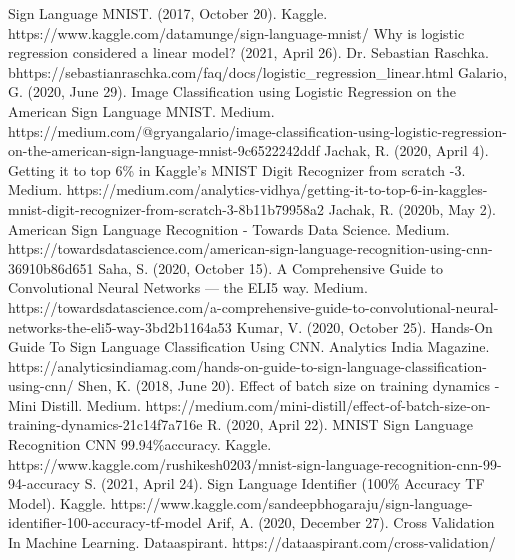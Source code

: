 \documentclass[conference]{IEEEtran}
\begin{document}
\begin{thebibliography}{00}

 Sign Language MNIST. (2017, October 20). Kaggle. https://www.kaggle.com/datamunge/sign-language-mnist/
 Why is logistic regression considered a linear model? (2021, April 26). Dr. Sebastian Raschka.
bhttps://sebastianraschka.com/faq/docs/logistic\_regression\_linear.html
 Galario, G. (2020, June 29). Image Classification using Logistic Regression on the American Sign Language MNIST. Medium. https://medium.com/@gryangalario/image-classification-using-logistic-regression-on-the-american-sign-language-mnist-9c6522242ddf
 Jachak, R. (2020, April 4). Getting it to top 6\% in Kaggle’s MNIST Digit Recognizer from scratch -3. Medium. https://medium.com/analytics-vidhya/getting-it-to-top-6-in-kaggles-mnist-digit-recognizer-from-scratch-3-8b11b79958a2
 Jachak, R. (2020b, May 2). American Sign Language Recognition - Towards Data Science. Medium. https://towardsdatascience.com/american-sign-language-recognition-using-cnn-36910b86d651
 Saha, S. (2020, October 15). A Comprehensive Guide to Convolutional Neural Networks — the ELI5 way. Medium. https://towardsdatascience.com/a-comprehensive-guide-to-convolutional-neural-networks-the-eli5-way-3bd2b1164a53
 Kumar, V. (2020, October 25). Hands-On Guide To Sign Language Classification Using CNN. Analytics India Magazine. https://analyticsindiamag.com/hands-on-guide-to-sign-language-classification-using-cnn/
 Shen, K. (2018, June 20). Effect of batch size on training dynamics - Mini Distill. Medium. https://medium.com/mini-distill/effect-of-batch-size-on-training-dynamics-21c14f7a716e
 R. (2020, April 22). MNIST Sign Language Recognition CNN 99.94\%accuracy. Kaggle. https://www.kaggle.com/rushikesh0203/mnist-sign-language-recognition-cnn-99-94-accuracy
 S. (2021, April 24). Sign Language Identifier (100\% Accuracy TF Model). Kaggle. https://www.kaggle.com/sandeepbhogaraju/sign-language-identifier-100-accuracy-tf-model
 Arif, A. (2020, December 27). Cross Validation In Machine Learning. Dataaspirant. https://dataaspirant.com/cross-validation/
\end{thebibliography}
\end{document}
